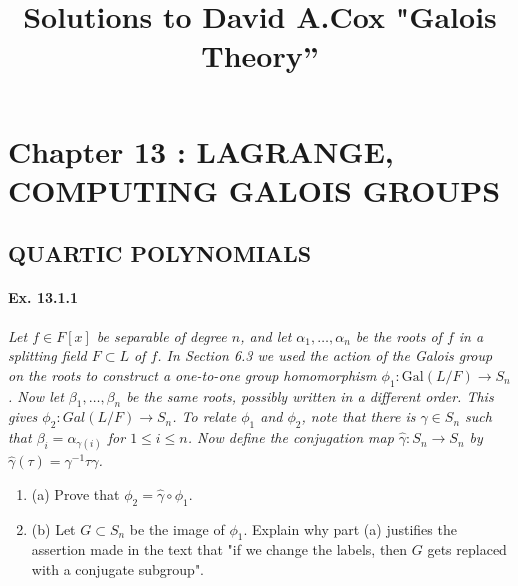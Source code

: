 \documentclass[11pt,a4paper]{article}
\title{Solutions to David A.Cox  "Galois Theory''}
\newcommand{\be} {\begin{enumerate}}
\newcommand{\ee} {\end{enumerate}}
\newcommand{\Gal}{\mathrm{Gal}}
\begin{document}
\section{Chapter 13 : LAGRANGE, COMPUTING GALOIS GROUPS}

\subsection{QUARTIC POLYNOMIALS}
\paragraph{Ex. 13.1.1}

{\it Let $f \in F[x]$ be separable of degree $n$, and let $\alpha_1,\ldots,\alpha_n$ be the roots of $f$ in a splitting field $F\subset L$ of $f$. In Section 6.3 we used the action of the Galois group on the roots to construct a one-to-one group homomorphism $\phi_1:\Gal(L/F) \to S_n$. Now let $\beta_1,\ldots,\beta_n$ be the same roots, possibly written in a different order. This gives $\phi_2 : Gal(L/F) \to S_n$. To relate $\phi_1$ and $\phi_2$, note that there is $\gamma \in S_n$ such that $\beta_i = \alpha_{\gamma(i)}$ for $1\leq i \leq n$. Now define the conjugation map $\hat{\gamma}:S_n \to S_n$ by $\hat{\gamma}(\tau) = \gamma^{-1} \tau \gamma$.
\be
\item[(a)] Prove that $\phi_2 = \hat{\gamma} \circ \phi_1$.
\item[(b)] Let $G \subset S_n$ be the image of $\phi_1$. Explain why part (a) justifies the assertion made in the text that "if we change the labels, then $G$ gets replaced with a conjugate subgroup".
\ee
}
\end{document}
